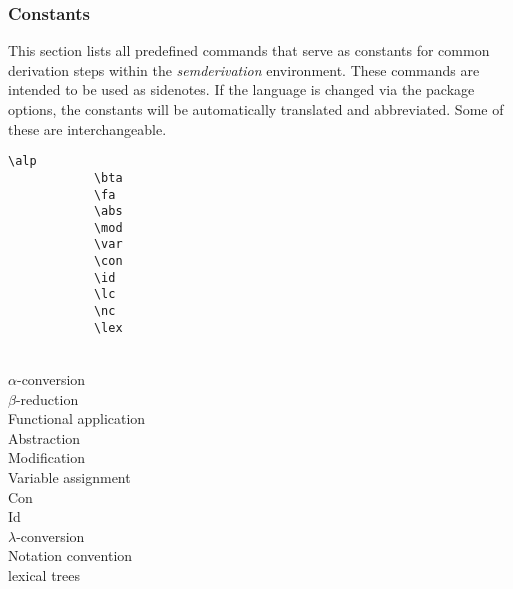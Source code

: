 \documentclass[10pt, a4paper]{article}
\begin{document}
	\subsubsection{Constants}
	This section lists all predefined commands that serve as constants for common derivation steps within the \textit{semderivation} environment. These commands are intended to be used as sidenotes. If the language is changed via the package options, the constants will be automatically translated and abbreviated. Some of these are interchangeable.
	\begin{center}
		\begin{minipage}[h][4.6cm][t]{15em}
			\begin{lstlisting}[style=B]
			\alp
			\bta
			\fa
			\abs
			\mod
			\var
			\con
			\id
			\lc
			\nc
			\lex
			\end{lstlisting}
		\end{minipage}
		\begin{minipage}[h][4.6cm][t]{15em}
			\begin{fgls}
				\ \\
				\ensuremath{\alpha}-conversion\\
				\ensuremath{\beta}-reduction\\
				Functional application\\
				Abstraction\\
				Modification\\
				Variable assignment\\
				Con\\
				Id\\
				\ensuremath{\lambda}-conversion\\
				Notation convention\\
				lexical trees
			\end{fgls}
		\end{minipage}
	\end{center}
\end{document}
